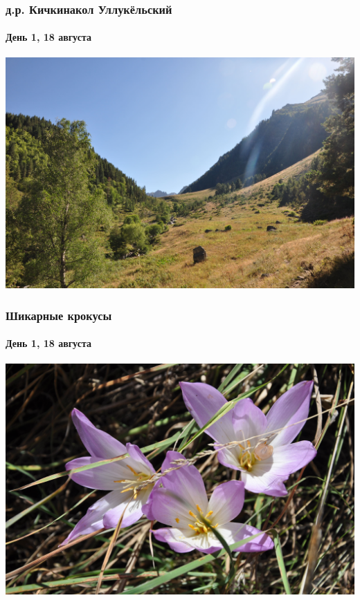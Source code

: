 \begin{frame}
{\begin{minipage}{\fourpicsize}
		\end{minipage}
		\hfill

	}
\end{frame}

\begin{frame}
	\frametitle{д.р. Кичкинакол Уллукёльский}
	\framesubtitle{День 1, 18 августа}
	\centering
	\includegraphics[width=\linewidth]{../pics/DSC_0528}
\end{frame}

\begin{frame}
	\frametitle{Шикарные крокусы}
	\framesubtitle{День 1, 18 августа}
	\centering
	\includegraphics[width=\linewidth]{../pics/DSC_0534}
\end{frame}

